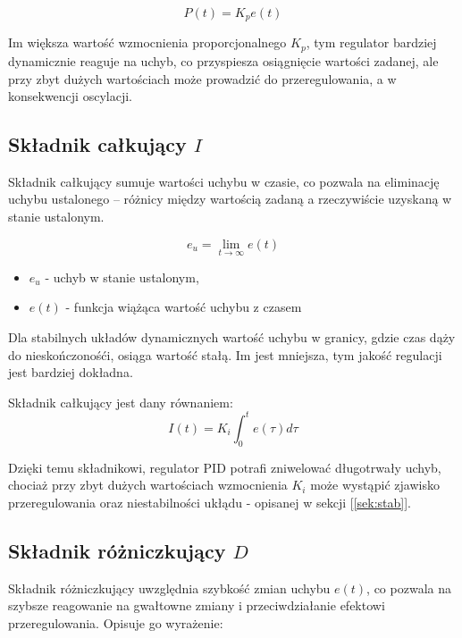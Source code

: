 \begin{equation}
P(t) = K_p e(t)
\end{equation}

Im większa wartość wzmocnienia proporcjonalnego $K_p$, tym regulator bardziej dynamicznie reaguje na uchyb, co przyspiesza osiągnięcie wartości zadanej, ale przy zbyt dużych wartościach może prowadzić do przeregulowania, a w konsekwencji oscylacji.

\subsection{Składnik całkujący $I$}

Składnik całkujący sumuje wartości uchybu w czasie, co pozwala na eliminację uchybu ustalonego – różnicy między wartością zadaną a rzeczywiście uzyskaną w stanie ustalonym.

\begin{equation}
    e_u = \lim_{t \to \infty} e(t)
    \label{eq:lim_stab}
\end{equation}

\begin{itemize}
    \item $e_u$ - uchyb w stanie ustalonym,
    \item $e(t)$ - funkcja wiążąca wartość uchybu z czasem
\end{itemize}

Dla stabilnych układów dynamicznych wartość uchybu w granicy, gdzie czas dąży do nieskończonośći, osiąga wartość stałą. Im jest mniejsza, tym jakość regulacji jest bardziej dokładna. 

\hspace{1cm}

Składnik całkujący jest dany równaniem:
\begin{equation}
I(t) = K_i \int_{0}^{t} e(\tau) d\tau
\end{equation}

Dzięki temu składnikowi, regulator PID potrafi zniwelować długotrwały uchyb, chociaż przy zbyt dużych wartościach wzmocnienia $K_i$ może wystąpić zjawisko przeregulowania oraz niestabilności ukłądu - opisanej w sekcji [\ref{sek:stab}].

\subsection{Składnik różniczkujący $D$}

Składnik różniczkujący uwzględnia szybkość zmian uchybu $e(t)$, co pozwala na szybsze reagowanie na gwałtowne zmiany i przeciwdziałanie efektowi przeregulowania. Opisuje go wyrażenie:

